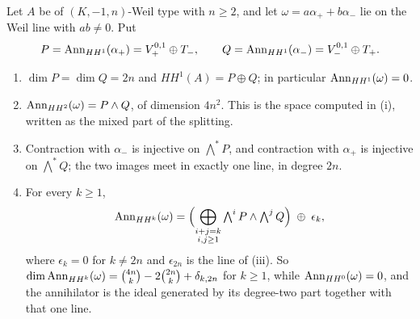 \begin{theorem}
\label{thm:hhsplitting}
Let $A$ be of $(K,-1,n)$-Weil type with $n\ge2$, and let
$\omega=a\alpha_{+}+b\alpha_{-}$ lie on the Weil line with $ab\ne0$. Put
\[
  P=\operatorname{Ann}_{HH^{1}}(\alpha_{+})=V_{+}^{0,1}\oplus T_{-},
  \qquad
  Q=\operatorname{Ann}_{HH^{1}}(\alpha_{-})=V_{-}^{0,1}\oplus T_{+} .
\]
\begin{enumerate}[label=\textup{(\roman*)},leftmargin=2.6em,itemsep=2pt]
\item $\dim P=\dim Q=2n$ and $HH^{1}(A)=P\oplus Q$; in particular
  $\operatorname{Ann}_{HH^{1}}(\omega)=0$.
\item $\operatorname{Ann}_{HH^{2}}(\omega)=P\wedge Q$, of dimension $4n^{2}$. This is the
  space computed in (i), written as the mixed part of the
  splitting.
\item Contraction with $\alpha_{-}$ is injective on $\bigwedge^{*}P$, and
  contraction with $\alpha_{+}$ is injective on $\bigwedge^{*}Q$; the two
  images meet in exactly one line, in degree $2n$.
\item For every $k\ge1$,
  \[
    \operatorname{Ann}_{HH^{k}}(\omega)
    =\Bigl(\bigoplus_{\substack{i+j=k\\ i,j\ge1}}
      \textstyle\bigwedge^{i}P\wedge\bigwedge^{j}Q\Bigr)\;\oplus\;\epsilon_{k},
  \]
  where $\epsilon_{k}=0$ for $k\ne2n$ and $\epsilon_{2n}$ is the line of
  \textup{(iii)}. So
  $\dim\operatorname{Ann}_{HH^{k}}(\omega)=\binom{4n}{k}-2\binom{2n}{k}+\delta_{k,2n}$ for
  $k\ge1$, while $\operatorname{Ann}_{HH^{0}}(\omega)=0$, and the annihilator is the ideal
  generated by its degree-two part together with that one line.
\end{enumerate}
\end{theorem}

